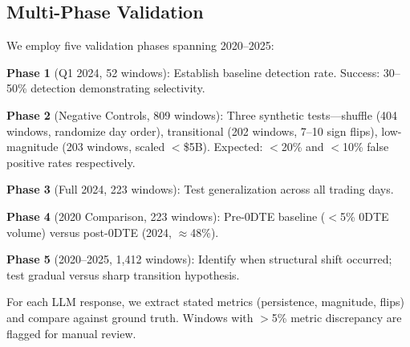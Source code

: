 \subsection{Multi-Phase Validation}

We employ five validation phases spanning 2020--2025:

\textbf{Phase 1} (Q1 2024, 52 windows): Establish baseline detection rate. Success: 30--50\% detection demonstrating selectivity.

\textbf{Phase 2} (Negative Controls, 809 windows): Three synthetic tests---shuffle (404 windows, randomize day order), transitional (202 windows, 7--10 sign flips), low-magnitude (203 windows, scaled $<$\$5B). Expected: $<$20\% and $<$10\% false positive rates respectively.

\textbf{Phase 3} (Full 2024, 223 windows): Test generalization across all trading days.

\textbf{Phase 4} (2020 Comparison, 223 windows): Pre-0DTE baseline ($<$5\% 0DTE volume) versus post-0DTE (2024, $\approx$48\%).

\textbf{Phase 5} (2020--2025, 1,412 windows): Identify when structural shift occurred; test gradual versus sharp transition hypothesis.

For each LLM response, we extract stated metrics (persistence, magnitude, flips) and compare against ground truth. Windows with $>$5\% metric discrepancy are flagged for manual review.
